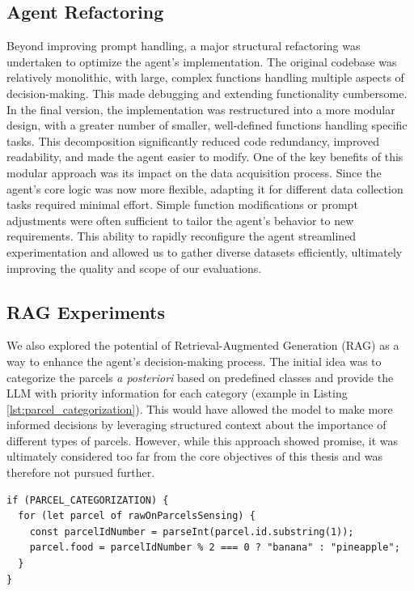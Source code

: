 \subsection{Agent Refactoring}
Beyond improving prompt handling, a major structural refactoring was undertaken
to optimize the agent's implementation. The original codebase was relatively monolithic,
with large, complex functions handling multiple aspects of decision-making. This
made debugging and extending functionality cumbersome. In the final version, the
implementation was restructured into a more modular design, with a greater number
of smaller, well-defined functions handling specific tasks. This decomposition significantly
reduced code redundancy, improved readability, and made the agent easier to modify.
One of the key benefits of this modular approach was its impact on the data
acquisition process. Since the agent's core logic was now more flexible,
adapting it for different data collection tasks required minimal effort. Simple function
modifications or prompt adjustments were often sufficient to tailor the agent's behavior
to new requirements. This ability to rapidly reconfigure the agent streamlined
experimentation and allowed us to gather diverse datasets efficiently, ultimately
improving the quality and scope of our evaluations.

\subsection{RAG Experiments}
We also explored the potential of Retrieval-Augmented Generation (RAG) as a way to
enhance the agent's decision-making process. The initial idea was to categorize
the parcels \emph{a posteriori} based on predefined classes and provide the LLM with
priority information for each category (example in Listing
\ref{lst:parcel_categorization}). This would have allowed the model to make more
informed decisions by leveraging structured context about the importance of
different types of parcels. However, while this approach showed promise, it was ultimately
considered too far from the core objectives of this thesis and was therefore not
pursued further.

\vspace{1mm}
\begin{codewindow}
    \begin{lstlisting}
if (PARCEL_CATEGORIZATION) {
  for (let parcel of rawOnParcelsSensing) {
    const parcelIdNumber = parseInt(parcel.id.substring(1));
    parcel.food = parcelIdNumber % 2 === 0 ? "banana" : "pineapple";
  }
}
\end{lstlisting}
\end{codewindow}
\vspace{1mm}

